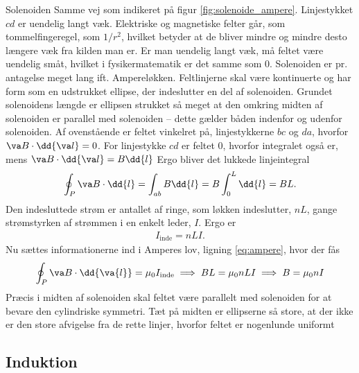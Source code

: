 \begin{opgave}{Solenoiden}
    \opg Samme vej som indikeret på figur \ref{fig:solenoide_ampere}.
    \opg Linjestykket $cd$ er uendelig langt væk. Elektriske og magnetiske felter går, som tommelfingeregel, som $1/r^2$, hvilket betyder at de bliver mindre og mindre desto længere væk fra kilden man er. Er man uendelig langt væk, må feltet være uendelig småt, hvilket i fysikermatematik er det samme som 0.
    \opg Solenoiden er pr. antagelse meget lang ift. Ampereløkken. Feltlinjerne skal være kontinuerte og har form som en udstrukket ellipse, der indeslutter en del af solenoiden. Grundet solenoidens længde er ellipsen strukket så meget at den omkring midten af solenoiden er parallel med solenoiden -- dette gælder båden indenfor og udenfor solenoiden.
    \opg Af ovenstående er feltet vinkelret på, linjestykkerne $bc$ og $da$, hvorfor $\va B \cdot \dd{\va l} = 0$. For linjestykke $cd$ er feltet 0, hvorfor integralet også er, mens $\va B \cdot \dd{\va l} = B\dd{l}$ Ergo bliver det lukkede linjeintegral
    \begin{align*}
        \oint_P \va B \cdot \dd{l} = \int_{ab} B\dd{l} = B\int_0^L \dd{l} = BL.
    \end{align*}
    \opg Den indesluttede strøm er antallet af ringe, som løkken indeslutter, $nL$, gange strømstyrken af strømmen i en enkelt leder, $I$. Ergo er
    \begin{align*}
        I_\mathrm{inde} = nLI.
    \end{align*}
    \opg Nu sættes informationerne ind i Amperes lov, ligning \eqref{eq:ampere}, hvor der fås
    \begin{align*}
        \oint_P \va B \cdot \dd{\va{l}} = \mu_0 I_\mathrm{inde} \implies BL = \mu_0nLI \implies B = \mu_0nI
    \end{align*}
    \opg Præcis i midten af solenoiden skal feltet være parallelt med solenoiden for at bevare den cylindriske symmetri. Tæt på midten er ellipserne så store, at der ikke er den store afvigelse fra de rette linjer, hvorfor feltet er nogenlunde uniformt
\end{opgave}


\subsection*{Induktion}

